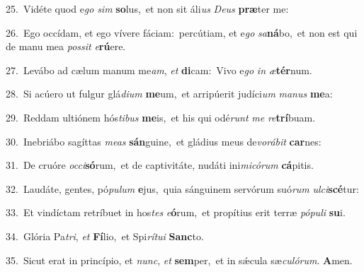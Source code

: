 {\numbfont\textcolor{\numbcolor}{25.}}~Vidéte quod e\textit{go} \textit{sim} \textbf{so}\-lus,~\star et non sit áli\textit{us} \textit{De}\-\textit{us} \textbf{præ}\-ter me:\par
{\numbfont\textcolor{\numbcolor}{26.}}~Ego occídam, et ego vívere fáciam:~\dagger percútiam, et e\textit{go} \textit{sa}\-\textbf{ná}bo,~\star et non est qui de manu mea \textit{pos}\-\textit{sit} \textit{e}\-\textbf{rú}ere.\par
{\numbfont\textcolor{\numbcolor}{27.}}~Levábo ad cælum manum me\-\textit{am}\-, \textit{et} \textbf{di}\-cam:~\star Vivo e\textit{go} \textit{in} \textit{æ}\-\textbf{tér}num.\par
{\numbfont\textcolor{\numbcolor}{28.}}~Si acúero ut fulgur glá\-\textit{di}\-\textit{um} \textbf{me}\-um,~\star et arripúerit judíci\textit{um} \textit{ma}\-\textit{nus} \textbf{me}\-a:\par
{\numbfont\textcolor{\numbcolor}{29.}}~Reddam ultiónem hós\-\textit{ti}\-\textit{bus} \textbf{me}\-is,~\star et his qui odé\textit{runt} \textit{me} \textit{re}\-\textbf{trí}buam.\par
{\numbfont\textcolor{\numbcolor}{30.}}~Inebriábo sagíttas \textit{me}\-\textit{as} \textbf{sán}\-guine,~\star et gládius meus de\-\textit{vo}\-\textit{rá}\textit{bit} \textbf{car}\-nes:\par
{\numbfont\textcolor{\numbcolor}{31.}}~De cruóre \textit{oc}\-\textit{ci}\textbf{só}rum,~\star et de captivitáte, nudáti ini\-\textit{mi}\-\textit{có}\textit{rum} \textbf{cá}\-pitis.\par
{\numbfont\textcolor{\numbcolor}{32.}}~Laudáte, gentes, pó\-\textit{pu}\-\textit{lum} \textbf{e}\-jus,~\star quia sánguinem servórum suó\textit{rum} \textit{ul}\-\textit{ci}\textbf{scé}tur:\par
{\numbfont\textcolor{\numbcolor}{33.}}~Et vindíctam retríbuet in hos\textit{tes} \textit{e}\-\textbf{ó}rum,~\star et propítius erit terræ \textit{pó}\-\textit{pu}\textit{li} \textbf{su}\-i.\par
{\numbfont\textcolor{\numbcolor}{34.}}~Glória Pa\-\textit{tri}\-, \textit{et} \textbf{Fí}\-lio,~\star et Spi\-\textit{rí}\-\textit{tu}\textit{i} \textbf{Sanc}\-to.\par
{\numbfont\textcolor{\numbcolor}{35.}}~Sicut erat in princípio, et \textit{nunc}\-, \textit{et} \textbf{sem}\-per,~\star et in sǽcula sæ\-\textit{cu}\-\textit{ló}\textit{rum}. \textbf{A}\-men.\par
